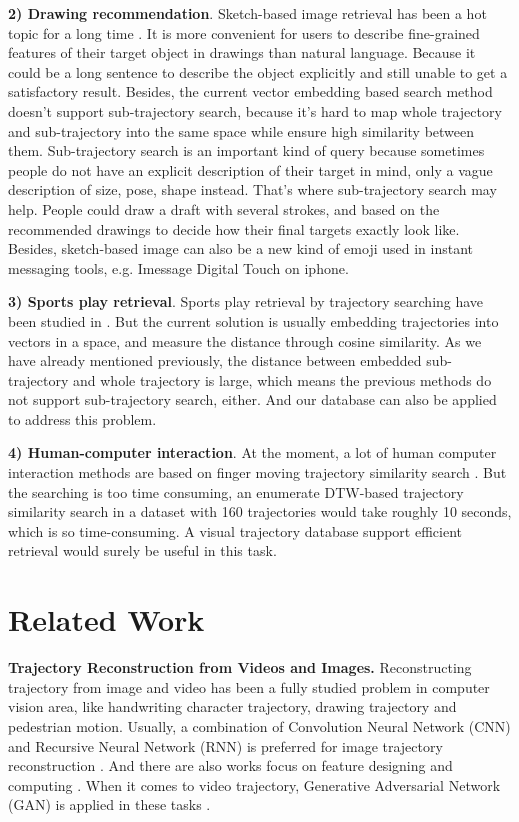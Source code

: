 \documentclass[sigconf]{acmart}
\begin{document}
\noindent
\textbf{2) Drawing recommendation}. Sketch-based image retrieval has been a hot topic for a long time \cite{SangkloyBHH16,CVPR/sketchMeTheShoes}. It is more convenient for users to describe fine-grained features of their target object in drawings than natural language. Because it could be a long sentence to describe the object explicitly and still unable to get a satisfactory result. Besides, the current vector embedding based search method doesn't support sub-trajectory search, because it's hard to map whole trajectory and sub-trajectory into the same space while ensure high similarity between them. Sub-trajectory search is an important kind of query because sometimes people do not have an explicit description of their target in mind, only a vague description of size, pose, shape instead. That's where sub-trajectory search may help. People could draw a draft with several strokes, and based on the recommended drawings to decide how their final targets exactly look like. Besides, sketch-based image can also be a new kind of emoji used in instant messaging tools, e.g. Imessage Digital Touch on iphone.

\noindent
\textbf{3) Sports play retrieval}. Sports play retrieval by trajectory searching have been studied in \cite{DBLP:conf/kdd/WangLCJ19, iui/ShaLYCRM16}. But the current solution is usually embedding trajectories into vectors in a space, and measure the distance through cosine similarity. As we have already mentioned previously, the distance between embedded sub-trajectory and whole trajectory is large, which means the previous methods do not support sub-trajectory search, either. And our database can also be applied to address this problem.

\noindent
\textbf{4) Human-computer interaction}. At the moment, a lot of human computer interaction methods are based on finger moving trajectory similarity search \cite{VikramLR13}. But the searching is too time consuming, an enumerate DTW-based trajectory similarity search in a dataset with 160 trajectories would take roughly 10 seconds, which is so time-consuming. A visual trajectory database support efficient retrieval would surely be useful in this task.  

\section{Related Work}
\noindent
\textbf{Trajectory Reconstruction from Videos and Images.} 
Reconstructing trajectory from image and video has been a fully studied problem in computer vision area, like handwriting character trajectory, drawing trajectory and pedestrian motion. Usually, a combination of Convolution Neural Network (CNN) and Recursive Neural Network (RNN) is preferred for image trajectory reconstruction \cite{ICPRtraj}. And there are also works focus on feature designing and computing \cite{CVPR/videotrackds}. When it comes to video trajectory, Generative Adversarial Network (GAN) is applied in these tasks \cite{GuptaJFSA18}. 
\end{document}
